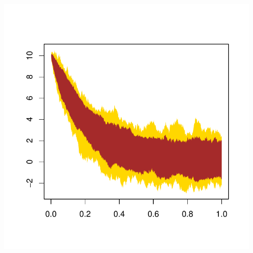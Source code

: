 \documentclass[10pt]{article}\usepackage[]{graphicx}\usepackage[]{color}
\makeatletter
\def\maxwidth{ %
  \ifdim\Gin@nat@width>\linewidth
    \linewidth
  \else
    \Gin@nat@width
  \fi
}
\newenvironment{knitrout}{}{} %
\makeatother
\begin{document}
\begin{knitrout}
{\centering \includegraphics[width=\maxwidth]{figure/unnamed-chunk-2} 

}



\end{knitrout}
\end{document}
